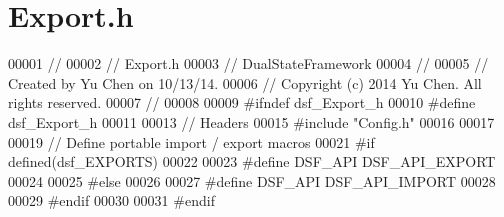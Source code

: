 \hypertarget{_export_8h_source}{}\section{Export.\+h}
\label{_export_8h_source}

\begin{DoxyCode}
00001 \textcolor{comment}{//}
00002 \textcolor{comment}{//  Export.h}
00003 \textcolor{comment}{//  DualStateFramework}
00004 \textcolor{comment}{//}
00005 \textcolor{comment}{//  Created by Yu Chen on 10/13/14.}
00006 \textcolor{comment}{//  Copyright (c) 2014 Yu Chen. All rights reserved.}
00007 \textcolor{comment}{//}
00008 
00009 \textcolor{preprocessor}{#ifndef dsf\_Export\_h}
00010 \textcolor{preprocessor}{#define dsf\_Export\_h}
00011 
00013 \textcolor{comment}{// Headers}
00015 \textcolor{comment}{}\textcolor{preprocessor}{#include "Config.h"}
00016 
00017 
00019 \textcolor{comment}{// Define portable import / export macros}
00021 \textcolor{comment}{}\textcolor{preprocessor}{#if defined(dsf\_EXPORTS)}
00022 
00023 \textcolor{preprocessor}{#define DSF\_API DSF\_API\_EXPORT}
00024 
00025 \textcolor{preprocessor}{#else}
00026 
00027 \textcolor{preprocessor}{#define DSF\_API DSF\_API\_IMPORT}
00028 
00029 \textcolor{preprocessor}{#endif}
00030 
00031 \textcolor{preprocessor}{#endif}
\end{DoxyCode}
